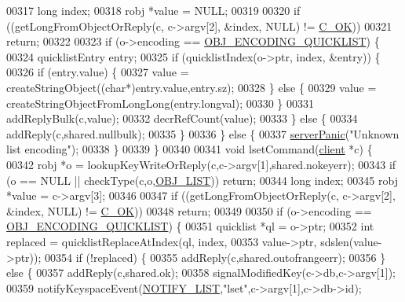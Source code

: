 \begin{DoxyCode}
00317     \textcolor{keywordtype}{long} index;
00318     robj *value = NULL;
00319 
00320     \textcolor{keywordflow}{if} ((getLongFromObjectOrReply(c, c->argv[2], &index, NULL) != \hyperlink{server_8h_a303769ef1065076e68731584e758d3e1}{C\_OK}))
00321         \textcolor{keywordflow}{return};
00322 
00323     \textcolor{keywordflow}{if} (o->encoding == \hyperlink{server_8h_aec792aeed6d4bf83966672e6a23043b8}{OBJ\_ENCODING\_QUICKLIST}) \{
00324         quicklistEntry entry;
00325         \textcolor{keywordflow}{if} (quicklistIndex(o->ptr, index, &entry)) \{
00326             \textcolor{keywordflow}{if} (entry.value) \{
00327                 value = createStringObject((\textcolor{keywordtype}{char}*)entry.value,entry.sz);
00328             \} \textcolor{keywordflow}{else} \{
00329                 value = createStringObjectFromLongLong(entry.longval);
00330             \}
00331             addReplyBulk(c,value);
00332             decrRefCount(value);
00333         \} \textcolor{keywordflow}{else} \{
00334             addReply(c,shared.nullbulk);
00335         \}
00336     \} \textcolor{keywordflow}{else} \{
00337         \hyperlink{server_8h_a11cc378e7778a830b41240578de3b204}{serverPanic}(\textcolor{stringliteral}{"Unknown list encoding"});
00338     \}
00339 \}
00340 
00341 \textcolor{keywordtype}{void} lsetCommand(\hyperlink{structclient}{client} *c) \{
00342     robj *o = lookupKeyWriteOrReply(c,c->argv[1],shared.nokeyerr);
00343     \textcolor{keywordflow}{if} (o == NULL || checkType(c,o,\hyperlink{server_8h_a4a5f22a280949c97a0cb0d4213275126}{OBJ\_LIST})) \textcolor{keywordflow}{return};
00344     \textcolor{keywordtype}{long} index;
00345     robj *value = c->argv[3];
00346 
00347     \textcolor{keywordflow}{if} ((getLongFromObjectOrReply(c, c->argv[2], &index, NULL) != \hyperlink{server_8h_a303769ef1065076e68731584e758d3e1}{C\_OK}))
00348         \textcolor{keywordflow}{return};
00349 
00350     \textcolor{keywordflow}{if} (o->encoding == \hyperlink{server_8h_aec792aeed6d4bf83966672e6a23043b8}{OBJ\_ENCODING\_QUICKLIST}) \{
00351         quicklist *ql = o->ptr;
00352         \textcolor{keywordtype}{int} replaced = quicklistReplaceAtIndex(ql, index,
00353                                                value->ptr, sdslen(value->ptr));
00354         \textcolor{keywordflow}{if} (!replaced) \{
00355             addReply(c,shared.outofrangeerr);
00356         \} \textcolor{keywordflow}{else} \{
00357             addReply(c,shared.ok);
00358             signalModifiedKey(c->db,c->argv[1]);
00359             notifyKeyspaceEvent(\hyperlink{server_8h_a1c0b64c84b0e66dff3554ffe3e2ec4c8}{NOTIFY\_LIST},\textcolor{stringliteral}{"lset"},c->argv[1],c->db->id);

\end{DoxyCode}
